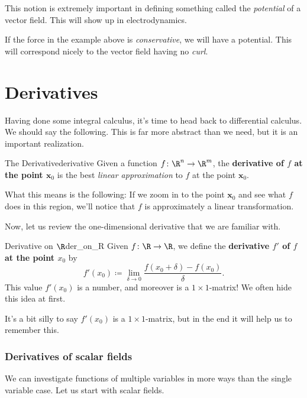         \begin{remark}
        This notion is extremely important in defining something called the \emph{potential} of a vector field.  This will show up in electrodynamics.
        
        If the force in the example above is \emph{conservative}, we will have a potential.  This will correspond nicely to the vector field having no \emph{curl}.
        \end{remark}
        
        \section{Derivatives}
        Having done some integral calculus, it's time to head back to differential calculus.  We should say the following. This is far more abstract than we need, but it is an important realization.  
        
        \begin{df}{The Derivative}{derivative}
        Given a function $f\colon \R^n \to \R^m$, the \textbf{derivative of $f$ at the point $\mathbf{x}_0$} is the best \emph{linear approximation} to $f$ at the point $\mathbf{x}_0$.
        
        What this means is the following: If we zoom in to the point $\mathbf{x}_0$ and see what $f$ does in this region, we'll notice that $f$ is approximately a linear transformation.
        \end{df}
        
        Now, let us review the one-dimensional derivative that we are familiar with.
        
        \begin{df}{Derivative on $\R$}{der_on_R}
        Given $f\colon \R \to \R$, we define the \textbf{derivative $f'$ of $f$ at the point $x_0$} by
        \[
        f'(x_0)\coloneqq \lim_{\delta \to 0} \frac{f(x_0+\delta)-f(x_0)}{\delta}.
        \]
        This value $f'(x_0)$ is a number, and moreover is a $1\times 1$-matrix!  We often hide this idea at first.
        \end{df}
        
        It's a bit silly to say $f'(x_0)$ is a $1\times 1$-matrix, but in the end it will help us to remember this.
        
        \subsubsection{Derivatives of scalar fields}
        We can investigate functions of multiple variables in more ways than the single variable case.  Let us start with scalar fields.
        
